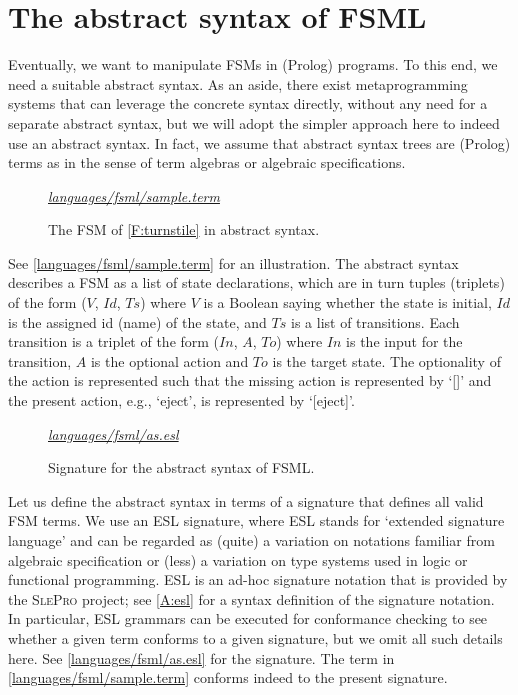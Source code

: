 \documentclass[preprint,authoryear,12pt]{noelsarticle}
\newcommand{\m}[1]{\ensuremath{\mathit{#1}}}
\newcommand{\slepro}{\textsc{SlePro}}
\newcommand{\codefigure}[3]{
\begin{figure}[t!]
\begin{boxedminipage}{\hsize}
\mbox{}\hfill{}{\small\textit{\href{http://github.com/slebok/slepro/tree/master/#2}{#2}}}

\end{boxedminipage}
\caption{#1.}
\label{#2}
\medskip
\end{figure}}
\begin{document}

\section{The abstract syntax of FSML}
\label{S:abstract}

Eventually, we want to manipulate FSMs in (Prolog) programs. To this
end, we need a suitable abstract syntax. As an aside, there exist
metaprogramming systems that can leverage the concrete syntax
directly, without any need for a separate abstract syntax, but we will
adopt the simpler approach here to indeed use an abstract syntax. In
fact, we assume that abstract syntax trees are (Prolog) terms as in
the sense of term algebras or algebraic specifications.

\codefigure{%
The FSM of \autoref{F:turnstile} in abstract syntax}{%
languages/fsml/sample.term}{%
prolog}

See \autoref{languages/fsml/sample.term} for an
illustration. The abstract syntax describes a FSM as a list of state
declarations, which are in turn tuples (triplets) of the form (\m{V},
\m{Id}, \m{Ts}) where \m{V} is a Boolean saying whether the state is
initial, \m{Id} is the assigned id (name) of the state, and \m{Ts} is
a list of transitions. Each transition is a triplet of the form
(\m{In}, \m{A}, \m{To}) where \m{In} is the input for the transition,
\m{A} is the optional action and \m{To} is the target state. The
optionality of the action is represented such that the missing action
is represented by `[]' and the present action, e.g., `eject', is
represented by `[eject]'.

\codefigure{%
Signature for the abstract syntax of FSML}{%
languages/fsml/as.esl}{%
esl}

Let us define the abstract syntax in terms of a signature that defines
all valid FSM terms. We use an ESL signature, where ESL stands for
`extended signature language' and can be regarded as (quite) a
variation on notations familiar from algebraic specification or (less)
a variation on type systems used in logic or functional
programming. ESL is an ad-hoc signature notation that is provided by
the \slepro{} project; see \ref{A:esl} for a syntax definition of
the signature notation. In particular, ESL grammars can be executed
for conformance checking to see whether a given term conforms to a
given signature, but we omit all such details here. See
\autoref{languages/fsml/as.esl} for the signature. The term in
\autoref{languages/fsml/sample.term} conforms indeed to
the present signature.
\end{document}

